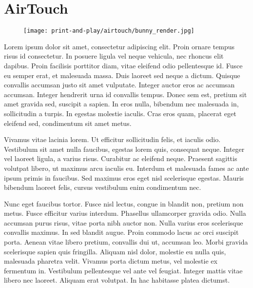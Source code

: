 	\chapter{AirTouch} \label{ch:airtouch}
	\begin{figure}[h]
		\centering
		\texttt{[image: print-and-play/airtouch/bunny\_render.jpg]}
	\end{figure}


	Lorem ipsum dolor sit amet, consectetur adipiscing elit. Proin ornare tempus
	risus id consectetur. In posuere ligula vel neque vehicula, nec rhoncus elit
	dapibus. Proin facilisis porttitor diam, vitae eleifend odio pellentesque id.
	Fusce eu semper erat, et malesuada massa. Duis laoreet sed neque a dictum.
	Quisque convallis accumsan justo sit amet vulputate. Integer auctor eros ac
	accumsan accumsan. Integer hendrerit urna id convallis tempus. Donec sem est,
	pretium sit amet gravida sed, suscipit a sapien. In eros nulla, bibendum nec
	malesuada in, sollicitudin a turpis. In egestas molestie iaculis. Cras eros
	quam, placerat eget eleifend sed, condimentum sit amet metus.

	Vivamus vitae lacinia lorem. Ut efficitur sollicitudin felis, et iaculis odio.
	Vestibulum sit amet nulla faucibus, egestas lorem quis, consequat neque.
	Integer vel laoreet ligula, a varius risus. Curabitur ac eleifend neque.
	Praesent sagittis volutpat libero, ut maximus arcu iaculis eu. Interdum et
	malesuada fames ac ante ipsum primis in faucibus. Sed maximus eros eget nisl
	scelerisque egestas. Mauris bibendum laoreet felis, cursus vestibulum enim
	condimentum nec.

	Nunc eget faucibus tortor. Fusce nisl lectus, congue in blandit non, pretium
	non metus. Fusce efficitur varius interdum. Phasellus ullamcorper gravida
	odio. Nulla accumsan purus risus, vitae porta nibh auctor non. Nulla varius
	eros scelerisque convallis maximus. In sed blandit augue. Proin commodo lacus
	ac orci suscipit porta. Aenean vitae libero pretium, convallis dui ut,
	accumsan leo. Morbi gravida scelerisque sapien quis fringilla. Aliquam nisl
	dolor, molestie eu nulla quis, malesuada pharetra velit. Vivamus porta dictum
	metus, vel molestie ex fermentum in. Vestibulum pellentesque vel ante vel
	feugiat. Integer mattis vitae libero nec laoreet. Aliquam erat volutpat. In
	hac habitasse platea dictumst.

	\newpage


